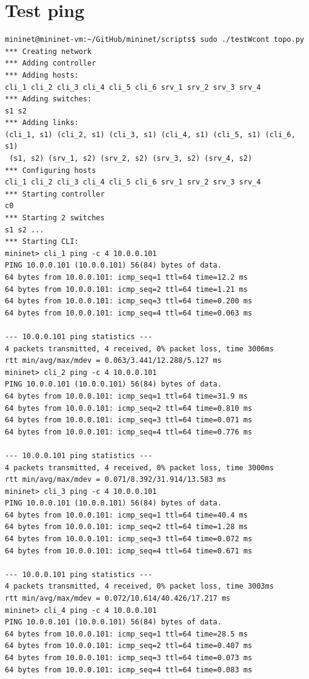 \documentclass{article}
\begin{document}
\appendix
\section{Test ping}
\begin{Verbatim}
mininet@mininet-vm:~/GitHub/mininet/scripts$ sudo ./testWcont topo.py
*** Creating network
*** Adding controller
*** Adding hosts:
cli_1 cli_2 cli_3 cli_4 cli_5 cli_6 srv_1 srv_2 srv_3 srv_4
*** Adding switches:
s1 s2
*** Adding links:
(cli_1, s1) (cli_2, s1) (cli_3, s1) (cli_4, s1) (cli_5, s1) (cli_6, s1)
 (s1, s2) (srv_1, s2) (srv_2, s2) (srv_3, s2) (srv_4, s2)
*** Configuring hosts
cli_1 cli_2 cli_3 cli_4 cli_5 cli_6 srv_1 srv_2 srv_3 srv_4
*** Starting controller
c0
*** Starting 2 switches
s1 s2 ...
*** Starting CLI:
mininet> cli_1 ping -c 4 10.0.0.101
PING 10.0.0.101 (10.0.0.101) 56(84) bytes of data.
64 bytes from 10.0.0.101: icmp_seq=1 ttl=64 time=12.2 ms
64 bytes from 10.0.0.101: icmp_seq=2 ttl=64 time=1.21 ms
64 bytes from 10.0.0.101: icmp_seq=3 ttl=64 time=0.200 ms
64 bytes from 10.0.0.101: icmp_seq=4 ttl=64 time=0.063 ms

--- 10.0.0.101 ping statistics ---
4 packets transmitted, 4 received, 0% packet loss, time 3006ms
rtt min/avg/max/mdev = 0.063/3.441/12.288/5.127 ms
mininet> cli_2 ping -c 4 10.0.0.101
PING 10.0.0.101 (10.0.0.101) 56(84) bytes of data.
64 bytes from 10.0.0.101: icmp_seq=1 ttl=64 time=31.9 ms
64 bytes from 10.0.0.101: icmp_seq=2 ttl=64 time=0.810 ms
64 bytes from 10.0.0.101: icmp_seq=3 ttl=64 time=0.071 ms
64 bytes from 10.0.0.101: icmp_seq=4 ttl=64 time=0.776 ms

--- 10.0.0.101 ping statistics ---
4 packets transmitted, 4 received, 0% packet loss, time 3000ms
rtt min/avg/max/mdev = 0.071/8.392/31.914/13.583 ms
mininet> cli_3 ping -c 4 10.0.0.101
PING 10.0.0.101 (10.0.0.101) 56(84) bytes of data.
64 bytes from 10.0.0.101: icmp_seq=1 ttl=64 time=40.4 ms
64 bytes from 10.0.0.101: icmp_seq=2 ttl=64 time=1.28 ms
64 bytes from 10.0.0.101: icmp_seq=3 ttl=64 time=0.072 ms
64 bytes from 10.0.0.101: icmp_seq=4 ttl=64 time=0.671 ms

--- 10.0.0.101 ping statistics ---
4 packets transmitted, 4 received, 0% packet loss, time 3003ms
rtt min/avg/max/mdev = 0.072/10.614/40.426/17.217 ms
mininet> cli_4 ping -c 4 10.0.0.101
PING 10.0.0.101 (10.0.0.101) 56(84) bytes of data.
64 bytes from 10.0.0.101: icmp_seq=1 ttl=64 time=28.5 ms
64 bytes from 10.0.0.101: icmp_seq=2 ttl=64 time=0.407 ms
64 bytes from 10.0.0.101: icmp_seq=3 ttl=64 time=0.073 ms
64 bytes from 10.0.0.101: icmp_seq=4 ttl=64 time=0.083 ms


\end{Verbatim}
\end{document}

